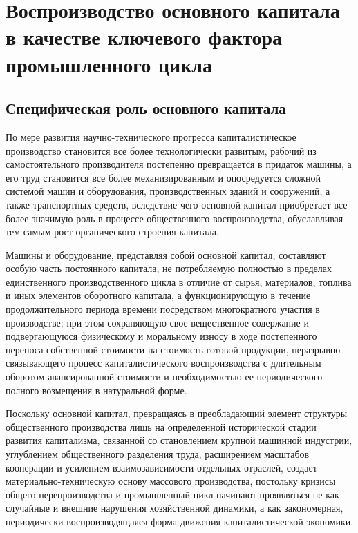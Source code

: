 \section{Воспроизводство основного капитала в качестве ключевого фактора промышленного цикла}

\subsection{Специфическая роль основного капитала}
По мере развития научно-технического прогресса капиталистическое производство становится все более технологически развитым, рабочий из самостоятельного производителя постепенно превращается в придаток машины, а его труд становится все более механизированным и опосредуется сложной системой машин и оборудования, производственных зданий и сооружений, а также транспортных средств, вследствие чего основной капитал приобретает все более значимую роль в процессе общественного воспроизводства, обуславливая тем самым рост органического строения капитала.

Машины и оборудование, представляя собой основной капитал, составляют особую часть постоянного капитала, не потребляемую полностью в пределах единственного производственного цикла в отличие от сырья, материалов, топлива и иных элементов оборотного капитала, а функционирующую в течение продолжительного периода времени посредством многократного участия в производстве; при этом сохраняющую свое вещественное содержание и подвергающуюся физическому и моральному износу в ходе постепенного переноса собственной стоимости на стоимость готовой продукции, неразрывно связывающего процесс капиталистического воспроизводства с длительным оборотом авансированной стоимости и необходимостью ее периодического полного возмещения в натуральной форме.

Поскольку основной капитал, превращаясь в преобладающий элемент структуры общественного производства лишь на определенной исторической стадии развития капитализма, связанной со становлением крупной машинной индустрии, углублением общественного разделения труда, расширением масштабов кооперации и усилением взаимозависимости отдельных отраслей, создает материально-техническую основу массового производства, постольку кризисы общего перепроизводства и промышленный цикл начинают проявляться не как случайные и внешние нарушения хозяйственной динамики, а как закономерная, периодически воспроизводящаяся форма движения капиталистической экономики.

